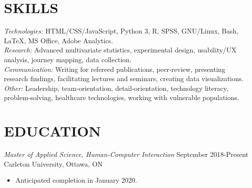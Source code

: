 \documentclass[10pt]{res} %
\begin{document}
\begin{resume}

 



\section{SKILLS} 

{\sl Technologies:} HTML/CSS/JavaScript, Python 3, R, SPSS, GNU/Linux, Bash,
\LaTeX, MS Office, Adobe Analytics. 
\vspace{2mm}\\
{\sl Research:} Advanced multivariate statistics, experimental design,
usability/UX analysis, journey mapping, data collection.
\vspace{2mm}\\
{\sl Communication:} Writing for refereed publications, peer-review, presenting research findings, facilitating lectures and seminars, creating data visualizations. 
\vspace{2mm}\\
{\sl Other:} Leadership, team-orientation, detail-orientation, technology literacy, problem-solving, healthcare technologies, working with vulnerable populations.


\section{EDUCATION}
{\sl Master of Applied Science, Human-Computer Interaction} \hfill September 2018-Present\newline
Carleton University, Ottawa, ON
\begin{itemize}
    \item Anticipated completion in January 2020.
\end{itemize}{}


\end{resume}
\end{document}
